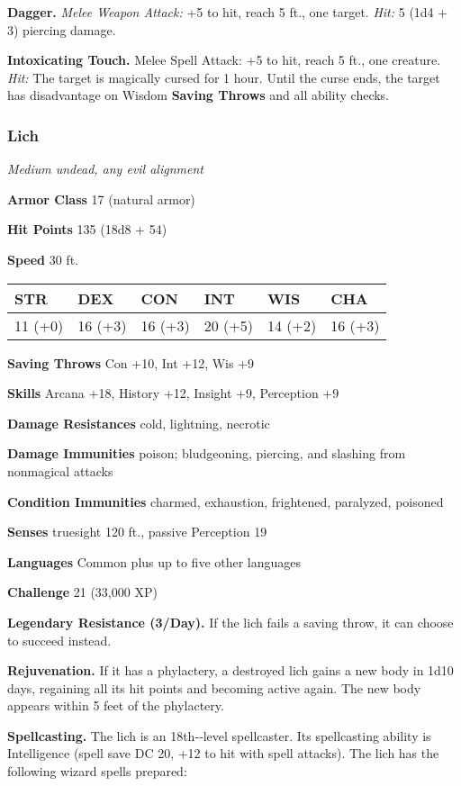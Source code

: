 \documentclass[
]{article}
\begin{document}
\textbf{Dagger.} \emph{Melee Weapon Attack:} +5 to hit, reach 5 ft., one
target. \emph{Hit:} 5 (1d4 + 3) piercing damage.

\textbf{Intoxicating Touch.} Melee Spell Attack: +5 to hit, reach 5 ft.,
one creature. \emph{Hit:} The target is magically cursed for 1 hour.
Until the curse ends, the target has disadvantage on Wisdom
\textbf{Saving Throws} and all ability checks.

\hypertarget{lich}{%
\subsubsection{Lich}\label{lich}}

\emph{Medium undead, any evil alignment}

\textbf{Armor Class} 17 (natural armor)

\textbf{Hit Points} 135 (18d8 + 54)

\textbf{Speed} 30 ft.

\begin{longtable}[]{@{}llllll@{}}
\toprule
STR & DEX & CON & INT & WIS & CHA\tabularnewline
\midrule
\endhead
11 (+0) & 16 (+3) & 16 (+3) & 20 (+5) & 14 (+2) & 16 (+3)\tabularnewline
\bottomrule
\end{longtable}

\textbf{Saving Throws} Con +10, Int +12, Wis +9

\textbf{Skills} Arcana +18, History +12, Insight +9, Perception +9

\textbf{Damage Resistances} cold, lightning, necrotic

\textbf{Damage Immunities} poison; bludgeoning, piercing, and slashing
from nonmagical attacks

\textbf{Condition Immunities} charmed, exhaustion, frightened,
paralyzed, poisoned

\textbf{Senses} truesight 120 ft., passive Perception 19

\textbf{Languages} Common plus up to five other languages

\textbf{Challenge} 21 (33,000 XP)

\textbf{Legendary Resistance (3/Day).} If the lich fails a saving throw,
it can choose to succeed instead.

\textbf{Rejuvenation.} If it has a phylactery, a destroyed lich gains a
new body in 1d10 days, regaining all its hit points and becoming active
again. The new body appears within 5 feet of the phylactery.

\textbf{Spellcasting.} The lich is an 18th-­‐level spellcaster. Its
spellcasting ability is Intelligence (spell save DC 20, +12 to hit with
spell attacks). The lich has the following wizard spells prepared:
\end{document}
